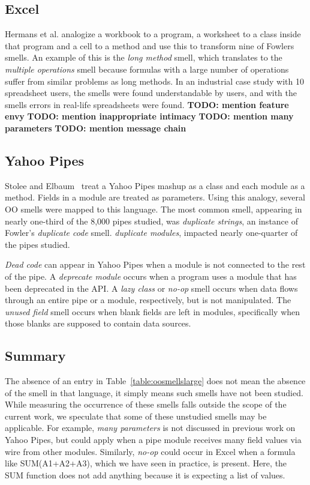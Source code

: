 \documentclass{sig-alternate}
\newcommand{\todo}[1]{\textbf{TODO: #1}}
\begin{document}
 \subsection{Excel}
Hermans et al. \cite{Hermans2012inter,Hermans2012intra} analogize a workbook to a program, a worksheet to a class inside that program and a cell to a method and use this to transform nine of Fowlers smells.
An example of this is the \emph{long method} smell, which translates to the \emph{multiple operations} smell because formulas with a large number of operations suffer from similar problems as long methods. In an industrial case study with 10 spreadsheet users, the smells were found understandable by users, and with the smells errors in real-life spreadsheets were found.
\todo{mention feature envy}
\todo{mention inappropriate intimacy}
\todo{mention many parameters}
\todo{mention message chain}

\subsection{Yahoo Pipes}
Stolee and Elbaum~\cite{Stolee2011, StoleeTSE2013} treat a Yahoo Pipes mashup as a class and each module as a method.  Fields in a module are treated as parameters. Using this analogy,  several OO smells were mapped to this language. The most common smell, appearing in nearly one-third of the 8,000 pipes studied, was \emph{duplicate strings}, an instance of Fowler's \emph{duplicate code} smell. 
\emph{duplicate modules}, impacted nearly one-quarter of the pipes studied. 
 
\emph{Dead code} can appear in Yahoo Pipes when a module is not connected to the rest of the pipe. A  \emph{deprecate module} occurs when a program uses a module that has been deprecated in the API. A \emph{lazy class} or \emph{no-op} smell occurs when data flows through an entire pipe or a module, respectively, but is not manipulated. The \emph{unused field} smell occurs when blank fields are left in modules, specifically when those blanks are supposed to contain data sources. 

\subsection{Summary}
The absence of an entry in Table~\ref{table:oosmellslarge} does not mean the absence of the smell in that language, it simply means such smells have not been studied. While measuring the occurrence of these smells falls outside the scope of the current work, we speculate
that some of these unstudied smells may be applicable. 
For example, \emph{many parameters} is not discussed in previous work on Yahoo Pipes, but could apply when a pipe module receives many field values via wire from other modules. 
Similarly, \emph{no-op} could occur in Excel when a formula like SUM(A1+A2+A3), which we have seen in practice, is present. Here, the SUM function does not add anything because it is expecting a list of values. 
\end{document}
